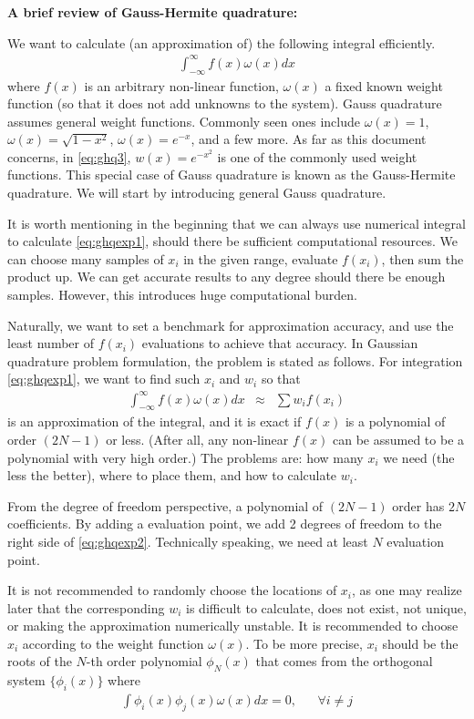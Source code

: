 \begin{mdframed}
	\textbf{A brief review of Gauss-Hermite quadrature:}
	
	We want to calculate (an approximation of) the following integral efficiently.
	\begin{eqnarray}
		\int_{-\infty}^{\infty} f(x) \omega(x)dx \label{eq:ghqexp1}
	\end{eqnarray}
	where $f(x)$ is an arbitrary non-linear function, $\omega(x)$ a fixed known weight function (so that it does not add unknowns to the system). Gauss quadrature assumes general weight functions. Commonly seen ones include $\omega(x) = 1$, $\omega(x) = \sqrt{1-x^2}$, $\omega(x) = e^{-x}$, and a few more. As far as this document concerns, in \eqref{eq:ghq3}, $w(x)=e^{-x^2}$ is one of the commonly used weight functions. This special case of Gauss quadrature is known as the Gauss-Hermite quadrature. We will start by introducing general Gauss quadrature.
	
	It is worth mentioning in the beginning that we can always use numerical integral to calculate \eqref{eq:ghqexp1}, should there be sufficient computational resources. We can choose many samples of $x_i$ in the given range, evaluate $f(x_i)$, then sum the product up. We can get accurate results to any degree should there be enough samples. However, this introduces huge computational burden.
	
	Naturally, we want to set a benchmark for approximation accuracy, and use the least number of $f(x_i)$ evaluations to achieve that accuracy. In Gaussian quadrature problem formulation, the problem is stated as follows. For integration \eqref{eq:ghqexp1}, we want to find such $x_i$ and $w_i$ so that
	\begin{eqnarray}
		\int_{-\infty}^{\infty} f(x) \omega(x)dx &\approx& \sum w_i f(x_i) \label{eq:ghqexp2}
	\end{eqnarray}
	is an approximation of the integral, and it is exact if $f(x)$ is a polynomial of order $(2N-1)$ or less. (After all, any non-linear $f(x)$ can be assumed to be a polynomial with very high order.) The problems are: how many $x_i$ we need (the less the better), where to place them, and how to calculate $w_i$.
	
	From the degree of freedom perspective, a polynomial of $(2N-1)$ order has $2N$ coefficients. By adding a evaluation point, we add 2 degrees of freedom to the right side of \eqref{eq:ghqexp2}. Technically speaking, we need at least $N$ evaluation point. 
	
	It is not recommended to randomly choose the locations of $x_i$, as one may realize later that the corresponding $w_i$ is difficult to calculate, does not exist, not unique, or making the approximation numerically unstable. It is recommended to choose $x_i$ according to the weight function $\omega(x)$. To be more precise, $x_i$ should be the roots of the $N$-th order polynomial $\phi_N(x)$ that comes from the orthogonal system $\{\phi_i(x)\}$ where
	\begin{eqnarray}
		\int \phi_i(x)\phi_j(x)\omega(x)dx = 0, && \forall i \neq j \nonumber
	\end{eqnarray} 
	

\end{mdframed}
